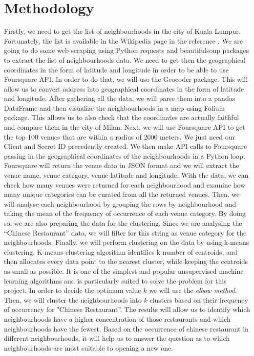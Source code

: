 \documentclass[12pt]{article} %
\begin{document}
\section {Methodology}

Firstly, we need to get the list of neighbourhoods in the city of Kuala Lumpur. Fortunately, the list is available in the Wikipedia page in the reference \cite{2:wi}. We are going to do some web scraping using Python requests and beautifulsoup packages to extract the list of neighbourhoods data. We need to get then the geographical coordinates in the form of latitude and longitude in order to be able to use Foursquare API. In order to do that, we will use the Geocoder package. This will allow us to convert address into geographical coordinates in the form of latitude and longitude. After gathering all the data, we will parse them into a pandas DataFrame and then visualize the neighbourhoods in a map using Folium package. This allows us to also check that the coordinates are actually faithful and compare them in the city of Milan. Next, we will use Foursquare API to get the top 100 venues that are within a radius of 2000 meters. We just need our Client and Secret ID precedently created. We then make API calls to Foursquare passing in the geographical coordinates of the neighbourhoods in a Python loop. Foursquare will return the venue data in JSON format and we will extract the venue name, venue category, venue latitude and longitude. With the data, we can check how many venues were returned for each neighbourhood and examine how many unique categories can be curated from all the returned venues. Then, we will analyse each neighbourhood by grouping the rows by neighbourhood and taking the mean of the frequency of occurrence of each venue category. By doing so, we are also preparing the data for the clustering. Since we are analysing the “Chinese Restaurant” data, we will filter for this string as venue category for the neighbourhoods. 
Finally, we will perform clustering on the data by using k-means clustering. K-means clustering algorithm identifies k number of centroids, and then allocates every data point to the nearest cluster, while keeping the centroids as small as possible. It is one of the simplest and popular unsupervised machine learning algorithms and is particularly suited to solve the problem for this project. In order to decide the optimum value $k$ we will use the \emph{elbow method}. Then, we will cluster the neighbourhoods into $k$ clusters based on their frequency of occurrency for "Chinese Restaurant”. The results will allow us to identify which neighbourhoods have a higher concentration of those restaurants and which neighbourhoods have the fewest. Based on the occurrence of chinese restaurant in different neighbourhoods, it will help us to answer the question as to which neighbourhoods are most suitable to opening a new one.
\end{document}
